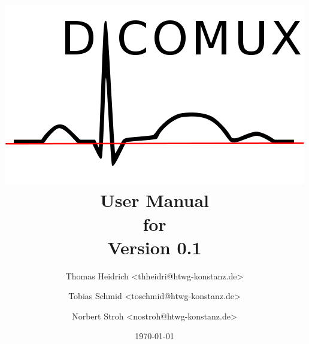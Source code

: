 %
%

\begin{titlepage}
\title{
	\centering
	\includegraphics[scale=0.8]{screens/logo_big.png}
	\medskip
	User Manual\\
	for\\
	Version 0.1
}

\author {
Thomas Heidrich <thheidri@htwg-konstanz.de> \and
Tobias Schmid <toschmid@htwg-konstanz.de> \and
Norbert Stroh <nostroh@htwg-konstanz.de>
}
\date{\today}
\maketitle
\end{titlepage}

%
%